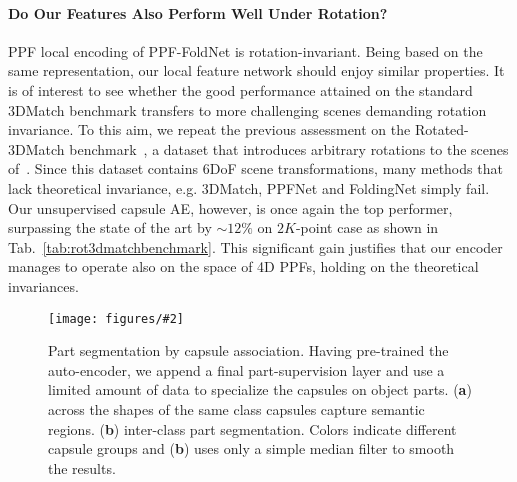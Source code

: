 \documentclass[10pt,twocolumn,letterpaper]{article}
\theoremstyle{break}
\newcommand{\insertimageStar}[5]{ \begin{figure*}[#5]
\centering
\texttt{[image: figures/\#2]}
\caption{#3}
\label{#4}
\end{figure*}
}
\begin{document}
\paragraph{Do Our Features Also Perform Well Under Rotation?} 
PPF local encoding of PPF-FoldNet is rotation-invariant. Being based on the same representation, our local feature network should enjoy similar properties. It is of interest to see whether the good performance attained on the standard 3DMatch benchmark transfers to more challenging scenes demanding rotation invariance. To this aim, we repeat the previous assessment on the Rotated-3DMatch benchmark~\cite{Deng_2018_ECCV}, a dataset that introduces arbitrary rotations to the scenes of~\cite{zeng20163dmatch}. Since this dataset contains 6DoF scene transformations, many methods that lack theoretical invariance, e.g. 3DMatch, PPFNet and FoldingNet simply fail. Our unsupervised capsule AE, however, is once again the top performer, surpassing the state of the art by $\sim 12\%$ on $2K$-point case as shown in Tab.~\ref{tab:rot3dmatchbenchmark}. This significant gain justifies that our encoder manages to operate also on the space of 4D PPFs, holding on the theoretical invariances.\vspace{-2mm}
\insertimageStar{.95}{part-seg_cropped.pdf}{Part segmentation by capsule association. Having pre-trained the auto-encoder, we append a final part-supervision layer and use a limited amount of data to specialize the capsules on object parts. (\textbf{a}) across the shapes of the same class capsules capture semantic regions. (\textbf{b}) inter-class part segmentation. Colors indicate different capsule groups and (\textbf{b}) uses only a simple median filter to smooth the results.\vspace{-2mm}}{fig:finetuning}{t!}
\end{document}
